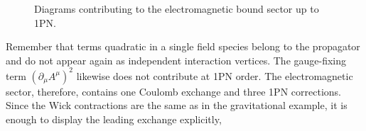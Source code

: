 \begin{figure}
    \centering
    \begin{subfigure}[t]{0.22\textwidth}
        \centering
{}
        \caption{}
        \label{mfig4a}
    \end{subfigure}
      \begin{subfigure}[t]{0.22\textwidth}
        \centering
{}
        \caption{}
        \label{mfig4b}
    \end{subfigure}
      \begin{subfigure}[t]{0.22\textwidth}
        \centering
{}
        \caption{}
        \label{mfig4c}
    \end{subfigure}
    \begin{subfigure}[t]{0.22\textwidth}
        \centering
{}
        \caption{}
        \label{mfig4d}
    \end{subfigure}
    \caption{Diagrams contributing to the electromagnetic bound sector up to 1PN.}
    \label{ch1:fig:em-bound}
\end{figure}
Remember that terms quadratic in a single field species belong to the propagator and do not appear again as independent interaction vertices. The gauge-fixing term $(\partial_\mu A^\mu)^2$ likewise does not contribute at 1PN order. The electromagnetic sector, therefore, contains one Coulomb exchange and three 1PN corrections. Since the Wick contractions are the same as in the gravitational example, it is enough to display the leading exchange explicitly,
